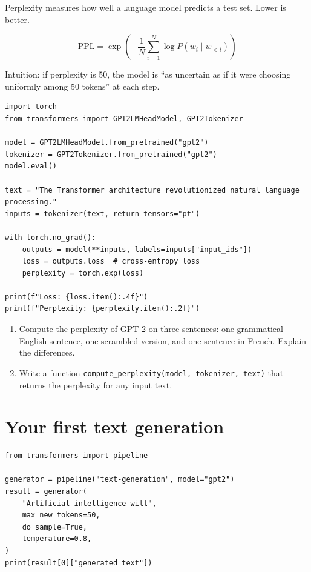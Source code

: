 Perplexity measures how well a language model predicts a test set. Lower is better.

\[
\text{PPL} = \exp\left(-\frac{1}{N}\sum_{i=1}^{N} \log P(w_i \mid w_{<i})\right)
\]

Intuition: if perplexity is 50, the model is ``as uncertain as if it were choosing uniformly among 50 tokens'' at each step.

\begin{verbatim}
import torch
from transformers import GPT2LMHeadModel, GPT2Tokenizer

model = GPT2LMHeadModel.from_pretrained("gpt2")
tokenizer = GPT2Tokenizer.from_pretrained("gpt2")
model.eval()

text = "The Transformer architecture revolutionized natural language processing."
inputs = tokenizer(text, return_tensors="pt")

with torch.no_grad():
    outputs = model(**inputs, labels=inputs["input_ids"])
    loss = outputs.loss  # cross-entropy loss
    perplexity = torch.exp(loss)

print(f"Loss: {loss.item():.4f}")
print(f"Perplexity: {perplexity.item():.2f}")
\end{verbatim}

\begin{exercise}
\begin{enumerate}
  \item Compute the perplexity of GPT-2 on three sentences: one grammatical English sentence, one scrambled version, and one sentence in French. Explain the differences.
  \item Write a function \texttt{compute\_perplexity(model, tokenizer, text)} that returns the perplexity for any input text.
\end{enumerate}
\end{exercise}

\section{Your first text generation}
\label{sec:first-generation}

\begin{verbatim}
from transformers import pipeline

generator = pipeline("text-generation", model="gpt2")
result = generator(
    "Artificial intelligence will",
    max_new_tokens=50,
    do_sample=True,
    temperature=0.8,
)
print(result[0]["generated_text"])
\end{verbatim}

